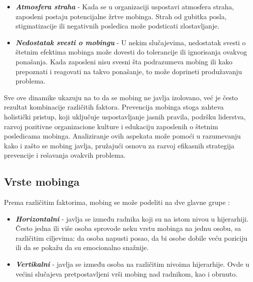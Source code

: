 \documentclass[a4paper]{article}
\begin{document}
\begin{itemize}
            \item \textbf{\textit{Atmosfera straha}} - Kada se u organizaciji uspostavi atmosfera straha, zaposleni postaju potencijalne žrtve mobinga. Strah od gubitka posla, stigmatizacije ili negativnih posledica može podsticati zlostavljanje.
            \item \textbf{\textit{Nedostatak svesti o mobingu}} - U nekim slučajevima, nedostatak svesti o štetnim efektima mobinga može dovesti do tolerancije ili ignorisanja ovakvog ponašanja. Kada zaposleni nisu svesni šta podrazumeva mobing ili kako prepoznati i reagovati na takvo ponašanje, to može doprineti produžavanju problema.
        \end{itemize}
        Sve ove dinamike ukazuju na to da se mobing ne javlja izolovano, već je često rezultat kombinacije različitih faktora.
        Prevencija mobinga stoga zahteva holistički pristup, koji uključuje uspostavljanje jasnih pravila, podršku liderstva, razvoj pozitivne organizacione kulture i edukaciju zaposlenih o štetnim posledicama mobinga. Analiziranje ovih aspekata može pomoći u razumevanju kako i zašto se mobing javlja, pružajući osnovu za razvoj efikasnih strategija prevencije i rešavanja ovakvih problema.
    
    \subsection{Vrste mobinga}
        Prema različitim faktorima, mobing se može podeliti na dve glavne grupe \cite{vrstemobinga}:
        \begin{itemize}
            \item \textbf{\textit{Horizontalni}} - javlja se između radnika koji su na istom nivou u hijerarhiji. Često jedna ili više osoba sprovode neku vrstu mobinga na jednu osobu, sa različitim ciljevima: da osoba napusti posao, da bi osobe dobile veću poziciju ili da se pokažu da su emocionalno snažnije.
            \item \textbf{\textit{Vertikalni}} - javlja se između osoba na različitim nivoima hijerarhije. Ovde u većini slučajeva pretpostavljeni vrši mobing nad radnikom, kao i obrnuto.
        \end{itemize}
        
\end{document}
